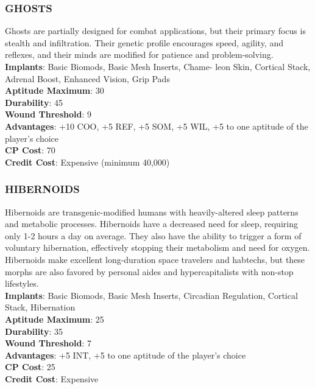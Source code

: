 \subsubsection{GHOSTS}
Ghosts are partially designed for combat applications,
but their primary focus is stealth and infiltration.
Their genetic profile encourages speed, agility, and
reflexes, and their minds are modified for patience and
problem-solving.
\\ \textbf{Implants}: Basic Biomods, Basic Mesh Inserts, Chame-
leon Skin, Cortical Stack, Adrenal Boost, Enhanced
Vision, Grip Pads
\\ \textbf{Aptitude Maximum}: 30
\\ \textbf{Durability}: 45
\\ \textbf{Wound Threshold}: 9
\\ \textbf{Advantages}: +10 COO, +5 REF, +5 SOM, +5 WIL, +5
to one aptitude of the player’s choice
\\ \textbf{CP Cost}: 70
\\ \textbf{Credit Cost}: Expensive (minimum 40,000)

\subsubsection{HIBERNOIDS}
Hibernoids are transgenic-modified humans with
heavily-altered sleep patterns and metabolic processes.
Hibernoids have a decreased need for sleep, requiring
only 1-2 hours a day on average. They also have the
ability to trigger a form of voluntary hibernation,
effectively stopping their metabolism and need for
oxygen. Hibernoids make excellent long-duration
space travelers and habtechs, but these morphs are
also favored by personal aides and hypercapitalists
with non-stop lifestyles.
\\ \textbf{Implants}: Basic Biomods, Basic Mesh Inserts, Circadian Regulation, Cortical Stack, Hibernation
\\ \textbf{Aptitude Maximum}: 25
\\ \textbf{Durability}: 35
\\ \textbf{Wound Threshold}: 7
\\ \textbf{Advantages}: +5 INT, +5 to one aptitude of the player’s
choice
\\ \textbf{CP Cost}: 25
\\ \textbf{Credit Cost}: Expensive

